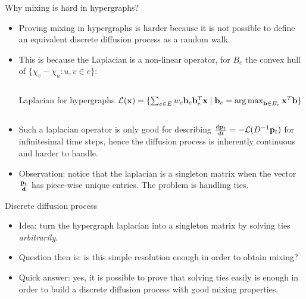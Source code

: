 \documentclass[../main.tex]{subfiles}
\begin{document}
    \begin{frame}{Why mixing is hard in hypergraphs?} 
        \begin{itemize}
        	\item Proving mixing in hypergraphs is harder because it is not possible to define an equivalent discrete diffusion process as a random walk.
        	\item This is because the Laplacian is a non-linear operator, for $B_e$ the convex hull of $\{\chi_v-\chi_u : u,v\in e\}$:
	        	\begin{columns}
	        		\begin{block}{Laplacian for hypergraphs}
	        			$ \mathcal{L}(\bold{x}) = \{\sum_{e\in E} w_e \bold{b}_e\bold{b}_e^T \bold{x} \mid \bold{b}_e = \operatorname*{arg\,max}_{\bold{b}\in B_e} \bold{x}^T\bold{b} \}$
	        		\end{block}
	        	\end{columns}
	        \item Such a laplacian operator is only good for describing $\frac{d \bold{p}_t}{d t} = -\mathcal{L}(D^{-1}\bold{p}_t)$ for infinitesimal time steps, hence the diffusion process is inherently continuous and harder to handle.
	        \item Observation: notice that the laplacian is a singleton matrix when the vector $\frac{\bold{p}_t}{\bold{d}}$ has piece-wise unique entries. The problem is handling ties. 	
        \end{itemize}
    \end{frame}
		
	\begin{frame}{Discrete diffusion process}
		\begin{itemize}
			\item Idea: turn the hypergraph laplacian into a singleton matrix by solving ties \textit{arbitrarily}. 
			\item Question then is: is this simple resolution enough in order to obtain mixing?
			\item Quick answer: yes, it is possible to prove that solving ties easily is enough in order to build a discrete diffusion process with good mixing properties.
		\end{itemize}
	\end{frame}
\end{document}
